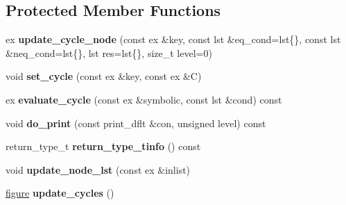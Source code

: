 \subsection*{Protected Member Functions}
\begin{DoxyCompactItemize}
\item 
\mbox{\label{class_moeb_inv_1_1figure_a53d5e42db02edb8cd83fcfd007721e82}} 
ex {\bfseries update\+\_\+cycle\+\_\+node} (const ex \&key, const lst \&eq\+\_\+cond=lst\{\}, const lst \&neq\+\_\+cond=lst\{\}, lst res=lst\{\}, size\+\_\+t level=0)
\item 
\mbox{\label{class_moeb_inv_1_1figure_a344c3bd7f96835710033f93537810599}} 
void {\bfseries set\+\_\+cycle} (const ex \&key, const ex \&C)
\item 
\mbox{\label{class_moeb_inv_1_1figure_acf7b35e710a1c3436bb8a9177c6c1506}} 
ex {\bfseries evaluate\+\_\+cycle} (const ex \&symbolic, const lst \&cond) const
\item 
\mbox{\label{class_moeb_inv_1_1figure_ad040638cbdce1a8b2ccea5651cad3c5c}} 
void {\bfseries do\+\_\+print} (const print\+\_\+dflt \&con, unsigned level) const
\item 
\mbox{\label{class_moeb_inv_1_1figure_a8c2652c1778c7f22416916d11d5540f9}} 
return\+\_\+type\+\_\+t {\bfseries return\+\_\+type\+\_\+tinfo} () const
\item 
\mbox{\label{class_moeb_inv_1_1figure_a27a6f97a9955992111d7c2ce7c099ff2}} 
void {\bfseries update\+\_\+node\+\_\+lst} (const ex \&inlist)
\item 
\mbox{\label{class_moeb_inv_1_1figure_a676003f88f8aac028bb98d4e8ccebcc3}} 
\mbox{\hyperlink{class_moeb_inv_1_1figure}{figure}} {\bfseries update\+\_\+cycles} ()
\end{DoxyCompactItemize}
